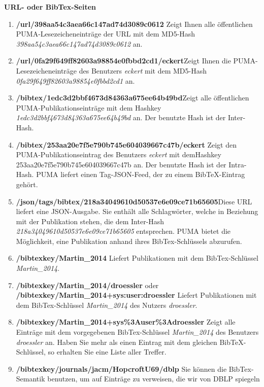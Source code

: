 \documentclass[a4paper,11pt,twoside]{scrbook}
\begin{document}
\textbf{URL- oder BibTex-Seiten}
\begin{enumerate}
    \item \textbf{/url/398aa54c3aea66c147ad74d3089c0612}\newline
    Zeigt Ihnen alle öffentlichen PUMA-Lesezeicheneinträge der URL mit dem MD5-Hash \textit{398aa54c3aea66c147ad74d3089c0612} an.
    \item \textbf{/url/0fa29f649ff82603a98854e0fbbd2cd1/eckert}\newline Zeigt Ihnen die PUMA-Lesezeicheneinträge des Benutzers \textit{eckert} mit dem MD5-Hash \textit{0fa29f649ff82603a98854e0fbbd2cd1} an.
	\item \textbf{/bibtex/1edc3d2bbf4673d84363a675ee64b49bd}\newline Zeigt alle öffentlichen PUMA-Publikationseinträge mit dem Hashkey \textit{1edc3d2bbf4673d84363a675ee64b49bd} an. Der benutzte Hash ist der Inter-Hash.
    \item \textbf{/bibtex/253aa20e7f5e790b745e604039667c47b/eckert}\newline
    Zeigt den PUMA-Publikationseintrag des Benutzers \textit{eckert} mit dem\newline Hashkey 253aa20e7f5e790b745e604039667c47b an. Der benutzte Hash ist der Intra-Hash. PUMA liefert einen Tag-JSON-Feed, der zu einem BibTeX-Eintrag gehört.
    \item \textbf{/json/tags/bibtex/218a34049610d50537e6e09ce71b65605}\newline Diese URL liefert eine JSON-Ausgabe. Sie enthält alle Schlagwörter, welche in Beziehung mit der Publikation stehen, die dem Inter-Hash \textit{218a34049610d50537e6e09ce71b65605} entsprechen. PUMA bietet die Möglichkeit, eine Publikation anhand ihres BibTex-Schlüssels abzurufen.
    \item \textbf{/bibtexkey/Martin\_2014} \newline
    Liefert Publikationen mit dem BibTex-Schlüssel \textit{Martin\_2014}.
    \item \textbf{/bibtexkey/Martin\_2014/droessler} 
    oder \newline \textbf{/bibtexkey/Martin\_2014+sys:user:droessler}\newline
    Liefert Publikationen mit dem BibTex-Schlüssel \textit{Martin\_2014} des Nutzers \textit{droessler}.
    \item \textbf{/bibtexkey/Martin\_2014+sys\%3Auser\%3Adroessler} \newline
    Zeigt alle Einträge mit dem vorgegebenen BibTex-Schlüssel \textit{Martin\_2014} des Benutzers \textit{droessler} an. Haben Sie mehr als einen Eintrag mit dem gleichen BibTeX-Schlüssel, so erhalten Sie eine Liste aller Treffer.
    \item \textbf{/bibtexkey/journals/jacm/HopcroftU69/dblp} \newline
    Sie können die BibTex-Semantik benutzen, um auf Einträge zu verweisen, die wir von DBLP spiegeln  %
\end{enumerate}
\end{document}

